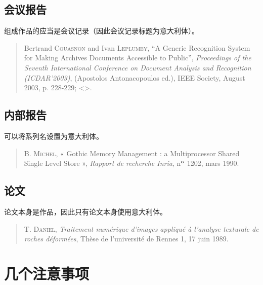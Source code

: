 \subsection{会议报告}

组成作品的应当是会议记录（因此会议记录标题为意大利体）。

\begin{quote}
    Bertrand \textsc{Coüasnon} and Ivan \textsc{Leplumey}, ``A Generic Recognition System for Making Archives Documents Accessible to Public'', \emph{Proceedings of the Seventh International Conference on Document Analysis and Recognition (ICDAR'2003)}, (Apostolos Antonacopoulos ed.), IEEE Society, August 2003, p. 228-229; <>.
\end{quote}

\subsection{内部报告}

可以将系列名设置为意大利体。

\begin{quote}
    B. \textsc{Michel}, « Gothic Memory Management : a Multiprocessor Shared Single Level Store », \emph{Rapport de recherche Inria}, n$^{\rm o}$ 1202, mars 1990.
\end{quote}

\subsection{论文}

论文本身是作品，因此只有论文本身使用意大利体。

\begin{quote}
    T. \textsc{Daniel}, \emph{Traitement numérique d'images appliqué à l'analyse texturale de roches déformées}, Thèse de l'université de Rennes 1, 17 juin 1989.
\end{quote}

\section{几个注意事项}

